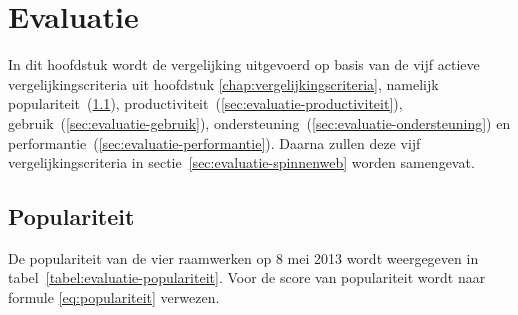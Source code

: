 \chapter{Evaluatie}
\label{chap:evaluatie}

In dit hoofdstuk wordt de vergelijking uitgevoerd op basis van de vijf actieve vergelijkingscriteria uit hoofdstuk \ref{chap:vergelijkingscriteria}, namelijk populariteit~(\ref{sec:evaluatie-populariteit}), productiviteit~(\ref{sec:evaluatie-productiviteit}), gebruik~(\ref{sec:evaluatie-gebruik}), ondersteuning~(\ref{sec:evaluatie-ondersteuning}) en performantie~(\ref{sec:evaluatie-performantie}). 
Daarna zullen deze vijf vergelijkingscriteria in sectie~\ref{sec:evaluatie-spinnenweb} worden samengevat.


\section{Populariteit} %
\label{sec:evaluatie-populariteit}

De populariteit van de vier raamwerken op 8 mei 2013 wordt weergegeven in tabel~\ref{tabel:evaluatie-populariteit}. 
Voor de score van populariteit wordt naar formule \ref{eq:populariteit} verwezen.

\begin{table}
\centering
{}
\caption{Overzicht van populariteit op 8 mei 2013 voor \st{}~(\sta), \kendo{}~(\kendoa), \jqm{}~(\jqma) en \lungo{}~(\lungoa).}
\label{tabel:evaluatie-populariteit}
\end{table}

